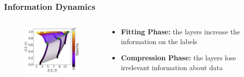 \documentclass{beamer}
\begin{document}
\begin{frame}
    \frametitle{Information Dynamics}
    \begin{columns}
        \begin{column}{0.5\textwidth}
            \begin{figure}
                \centering
                \includegraphics[width=6cm]{IB_information_plane.jpg}
            \end{figure}
        \end{column}
        \begin{column}{0.45\textwidth}
            \begin{itemize}
                \item \textbf{Fitting Phase:} the layers increase the information on the labels 
                \item \textbf{Compression Phase:} the layers lose irrelevant information about data 
            \end{itemize}
        \end{column}
    \end{columns}

\end{frame}
\end{document}
